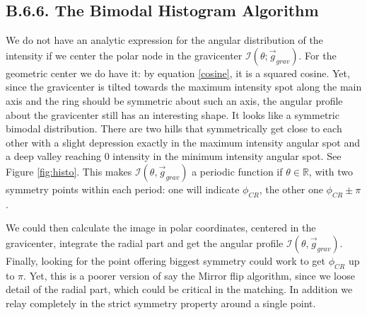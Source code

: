 \documentclass[11pt, a4paper, twoside]{article} %
\newcommand{\R}{\mathbb{R}} %
\begin{document}
\subsection*{B.6.6. The Bimodal Histogram Algorithm}\vspace{-0.15cm}
We do not have an analytic expression for the angular distribution of the intensity if we center the polar node in the gravicenter $\mathcal{I}(\theta;\vec{g}_{grav})$. For the geometric center we do have it: by equation \eqref{cosine}, it is a squared cosine. Yet, since the gravicenter is tilted towards the maximum intensity spot along the main axis and the ring should be symmetric about such an axis, the angular profile about the gravicenter still has an interesting shape. It looks like a symmetric bimodal distribution. There are two hills that symmetrically get close to each other with a slight depression exactly in the maximum intensity angular spot and a deep valley reaching 0 intensity in the minimum intensity angular spot. See Figure \ref{fig:histo}. This makes $\mathcal{I}(\theta,\vec{g}_{grav})$ a periodic function if $\theta\in\R$, with two symmetry points within each period: one will indicate $\phi_{CR}$, the other one $\phi_{CR}\pm\pi$.

We could then calculate the image in polar coordinates, centered in the gravicenter, integrate the radial part and get the angular profile $\mathcal{I}(\theta,\vec{g}_{grav})$. Finally, looking for the point offering biggest symmetry could work to get $\phi_{CR}$ up to $\pi$. Yet, this is a poorer version of say the Mirror flip algorithm, since we loose detail of the radial part, which could be critical in the matching. In addition we relay completely in the strict symmetry property around a single point.
\end{document}
